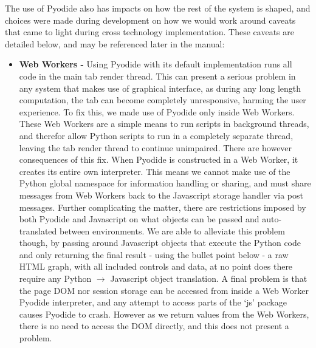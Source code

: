 The use of Pyodide also has impacts on how the rest of the system is shaped, and choices were made during development on how we would work around caveats that came to light during 
cross technology implementation. These caveats are detailed below, and may be referenced later in the manual:

\begin{itemize}
    \item {\bf Web Workers - } Using Pyodide with its default implementation runs all code in the main tab render thread. This can present a serious
    problem in any system that makes use of graphical interface, as during any long length computation, the tab can become completely unresponsive, harming the user experience.
    To fix this, we made use of Pyodide only inside Web Workers. These Web Workers are a simple means to run scripts in background threads, and therefor allow Python scripts to run
    in a completely separate thread, leaving the tab render thread to continue unimpaired. 
    There are however consequences of this fix. When Pyodide is constructed in a Web Worker, it creates its entire own interpreter. This means we cannot
    make use of the Python global namespace for information handling or sharing, and must share messages from Web Workers back to the Javascript storage handler via post messages.
    Further complicating the matter, there are restrictions imposed by both Pyodide and Javascript on what objects can be passed and auto-translated between environments.
    We are able to alleviate this problem though, by passing around Javascript objects that execute the Python code and only returning the final result - using the bullet point below - 
    a raw HTML graph, with all included controls and data, at no point does there require any Python $ \to $ Javascript object translation.
    A final problem is that the page DOM nor session storage can be accessed from inside a Web Worker Pyodide interpreter, and any attempt to access parts of the `js' package causes Pyodide to crash.
    However as we return values from the Web Workers, there is no need to access the DOM directly, and this does not present a problem.


\end{itemize}
